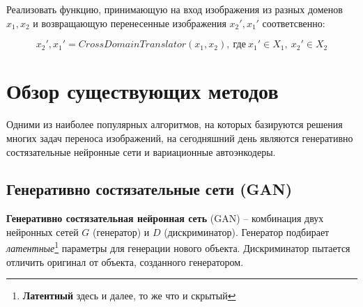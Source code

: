 \documentclass[11pt,a4paper]{extarticle}
\begin{document}
			\noindent
			Реализовать функцию, принимающую на вход изображения из разных доменов
			\(x_{1}, x_{2}\) и возвращающую перенесенные изображения \(x_{2}', x_{1}'\) соответсвенно: 

			\begin{equation}
					x_{2}', x_{1}'  = CrossDomainTranslator(x_{1}, x_{2}),\ \text{где}\ x_{1}' \in X_{1},\ x_{2}' \in X_{2}
			\end{equation}
	
	\newpage
	\section{Обзор существующих методов}
		
		Одними из наиболее популярных алгоритмов, на которых базируются решения многих задач переноса изображений, на сегодняшний день являются
		генеративно состязательные нейронные сети и вариационные автоэнкодеры.

		\subsection{Генеративно состязательные сети (GAN)}		

			\textbf{Генеративно состязательная нейронная сеть} (GAN) -- комбинация двух нейронных сетей $G$ (генератор) и $D$ (дискриминатор).
			Генератор подбирает \textit{латентные}\footnote{
				\textbf{Латентный} здесь и далее, то же что и скрытый
			} параметры для генерации нового объекта.
			Дискриминатор пытается отличить оригинал от объекта, созданного генератором.
			
\end{document}

